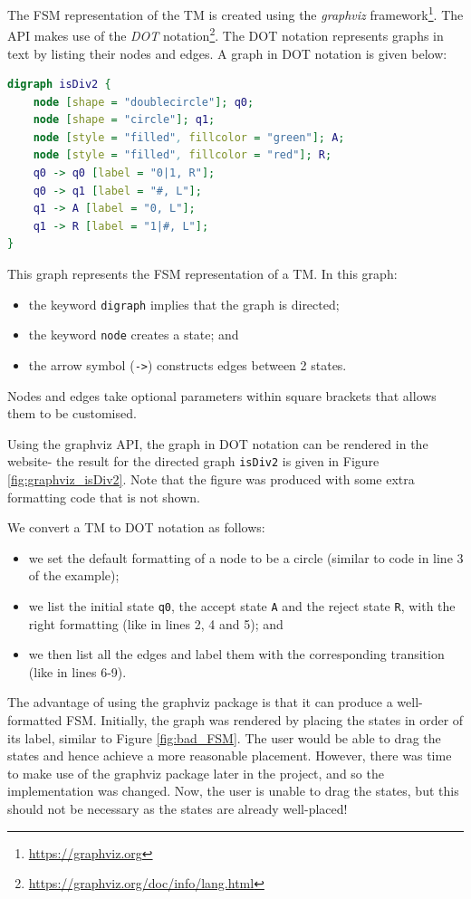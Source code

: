 The FSM representation of the TM is created using the \emph{graphviz} framework\footnote{\url{https://graphviz.org}}. The API makes use of the \emph{DOT} notation\footnote{\url{https://graphviz.org/doc/info/lang.html}}. The DOT notation represents graphs in text by listing their nodes and edges. A graph in DOT notation is given below:
\begin{lstlisting}[language=DOT]
digraph isDiv2 {
    node [shape = "doublecircle"]; q0;
    node [shape = "circle"]; q1;
    node [style = "filled", fillcolor = "green"]; A;
    node [style = "filled", fillcolor = "red"]; R;
    q0 -> q0 [label = "0|1, R"];
    q0 -> q1 [label = "#, L"];
    q1 -> A [label = "0, L"];
    q1 -> R [label = "1|#, L"];
}
\end{lstlisting}
This graph represents the FSM representation of a TM. In this graph:
\begin{itemize}
    \item the keyword \texttt{digraph} implies that the graph is directed;
    \item the keyword \texttt{node} creates a state; and
    \item the arrow symbol (\texttt{->}) constructs edges between 2 states.
\end{itemize}
Nodes and edges take optional parameters within square brackets that allows them to be customised.

Using the graphviz API, the graph in DOT notation can be rendered in the website- the result for the directed graph \texttt{isDiv2} is given in Figure \ref{fig:graphviz_isDiv2}. Note that the figure was produced with some extra formatting code that is not shown.

We convert a TM to DOT notation as follows:
\begin{itemize}
    \item we set the default formatting of a node to be a circle (similar to code in line 3 of the example);
    \item we list the initial state \texttt{q0}, the accept state \texttt{A} and the reject state \texttt{R}, with the right formatting (like in lines 2, 4 and 5); and 
    \item we then list all the edges and label them with the corresponding transition (like in lines 6-9).
\end{itemize}

The advantage of using the graphviz package is that it can produce a well-formatted FSM. Initially, the graph was rendered by placing the states in order of its label, similar to Figure \ref{fig:bad_FSM}. The user would be able to drag the states and hence achieve a more reasonable placement. However, there was time to make use of the graphviz package later in the project, and so the implementation was changed. Now, the user is unable to drag the states, but this should not be necessary as the states are already well-placed!


